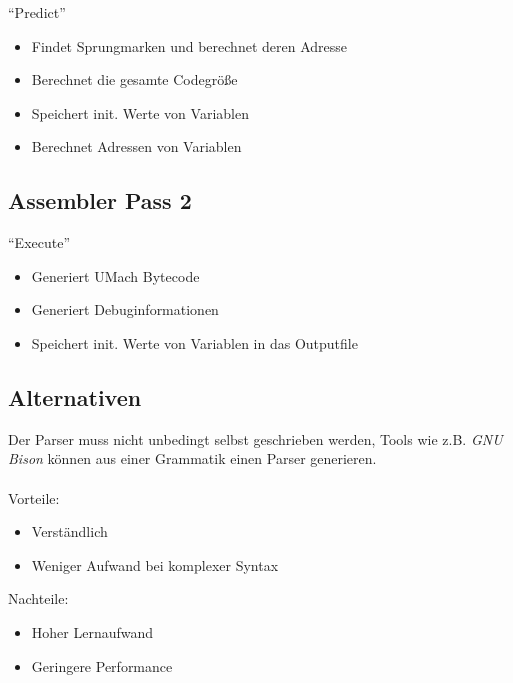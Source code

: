 \begin{frame}{\insertsection}{\insertsubsection}
    ``Predict''
    \begin{itemize}
        \item Findet Sprungmarken und berechnet deren Adresse
        \item Berechnet die gesamte Codegröße
        \item Speichert init. Werte von Variablen
        \item Berechnet Adressen von Variablen
    \end{itemize}
\end{frame}

\subsection{Assembler Pass 2}

\begin{frame}{\insertsection}{\insertsubsection}
    ``Execute''
    \begin{itemize}
        \item Generiert UMach Bytecode
        \item Generiert Debuginformationen
        \item Speichert init. Werte von Variablen in das Outputfile
    \end{itemize}
\end{frame}

\subsection{Alternativen}

\begin{frame}{\insertsection}{\insertsubsection}
    Der Parser muss nicht unbedingt selbst geschrieben werden,
    Tools wie z.B. \textit{GNU Bison} können aus einer Grammatik einen
    Parser generieren.\\~\\
    Vorteile:
    \begin{itemize}
        \item Verständlich
        \item Weniger Aufwand bei komplexer Syntax
    \end{itemize}
    Nachteile:
    \begin{itemize}
        \item Hoher Lernaufwand
        \item Geringere Performance
    \end{itemize}
\end{frame}

